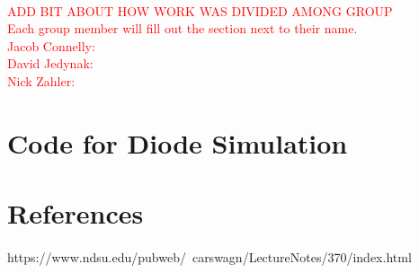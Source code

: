 \documentclass[a4paper]{article}
\begin{document}
\paragraph{}
 \textcolor{red}{ADD BIT ABOUT HOW WORK WAS DIVIDED AMONG GROUP}\\
 \textcolor{red}{Each group member will fill out the section next to their name.\\
Jacob Connelly:\\
David Jedynak:\\
Nick Zahler:\\}

\section{Code for Diode Simulation}
\paragraph{}



\section{References}
\paragraph{}
https://www.ndsu.edu/pubweb/~carswagn/LectureNotes/370/index.html
\end{document}
